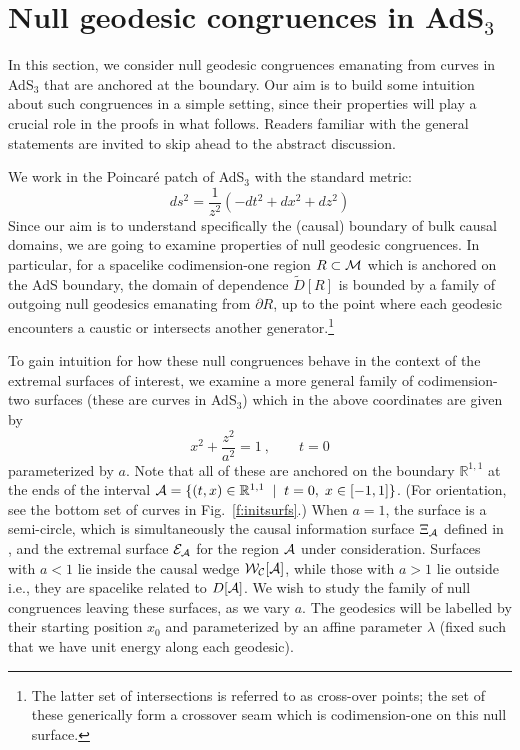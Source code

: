 \documentclass[12pt]{article}
\def\bulkD{{\tilde D}}
\def\AdS#1{\AdS$_{#1}$}
\def\bulk{{\cal M}}
\def\regA{{\cal A}}
\def\domdA{D[\regA]}
\def\extr{{\cal E}_\regA}
\def\CIS{{\Xi_\regA}}
\def\CWA{{\cal W}_{\cal C}[\regA]}
\def\AdS#1{AdS$_{#1}$}
\begin{document}
\section{Null geodesic congruences in \AdS{3}}
\label{sec:examples}

In this section, we consider null geodesic congruences emanating from curves in \AdS{3} that are anchored at the boundary.  Our aim is to build some intuition about such congruences in a simple setting, since their properties will play a crucial role in the proofs in what follows. Readers familiar with the general statements are invited to skip ahead to the abstract discussion.


We work in the Poincar\'e patch of \AdS{3} with the standard metric:
%
\begin{equation}
ds^2 = \frac{1}{z^2} \left( -dt^2 + dx^2 + dz^2 \right)
\label{fgads3}
\end{equation}	
%
Since our aim is to understand specifically the (causal) boundary of  bulk causal domains, we are going to examine properties of null geodesic congruences.  In particular, for a spacelike codimension-one  region $R\subset\bulk$ which is anchored on the AdS boundary, 
the domain of dependence $\bulkD[R]$ is bounded by a family of  outgoing null geodesics emanating from $\partial R$, up to the point where each geodesic encounters a caustic or intersects another generator.\footnote{ 
The latter set of intersections is referred to as cross-over points; the set of these generically form a crossover seam which is codimension-one on this null surface.}


To gain intuition for how these null congruences behave in the context of the extremal surfaces of interest, we examine a more general family of codimension-two surfaces (these are curves in \AdS{3}) which in the above coordinates are given by 
%
\begin{equation}
x^2 + \frac{z^2}{a^2} = 1 \ , \qquad  t=0
\label{initsurfellipse}
\end{equation}	
%
parameterized by $a$.  Note that all of these are anchored on the boundary ${\mathbb R}^{1,1}$ at the ends of the interval $\regA = \{(t,x) \in {\mathbb R}^{1,1} \;\mid\; t=0,\; x\in [-1,1]\} $. (For orientation, see the bottom set of curves in Fig.~\ref{f:initsurfs}.) When $a=1$, the surface is a semi-circle, which is simultaneously the causal information surface $\CIS$ defined in \cite{Hubeny:2012wa}, and the extremal surface $\extr$ for the region $\regA$ under consideration.  Surfaces with $a< 1$ lie inside the causal wedge $\CWA$, while those with $a>1$ lie outside i.e., they are spacelike related to $\domdA$. We wish to study the family of null congruences leaving these surfaces, as we vary $a$. The geodesics will be labelled by their starting position $x_0$  and parameterized by an affine parameter $\lambda$ (fixed such that we have unit energy along each geodesic). 
\end{document}
